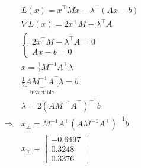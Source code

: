 \documentclass{article}
\theoremstyle{definition} %
\begin{document}
\begin{align*}
	&L(x)= x^{\top} M x-\lambda^{\top}\left(A x-b\right) \\
	&\nabla L(x)= 2 x^{\top} M-\lambda^{\top} A\\
	&\left\{\begin{array}{l}2 x^{\top} M-\lambda^{\top} A=0 \\ A x-b = 0\end{array}\right.\\
	&x=\frac{1}{2} M^{-1} A^{\top} \lambda\\
	&\frac{1}{2} \underbrace{A M^{-1} A^{\top}}_{\text {invertible}} \lambda=b\\
	&\lambda=2\left(A M^{-1} A^{\top}\right)^{-1} b\\
	\Rightarrow\ &x_{\ln}=M^{-1} A^{\top}\left(A M^{-1} A^{\top}\right)^{-1} b\\
	&x_{\ln}=\left[\begin{array}{c}-0.6497 \\ 0.3248 \\ 0.3376\end{array}\right]
\end{align*}
\end{document}
